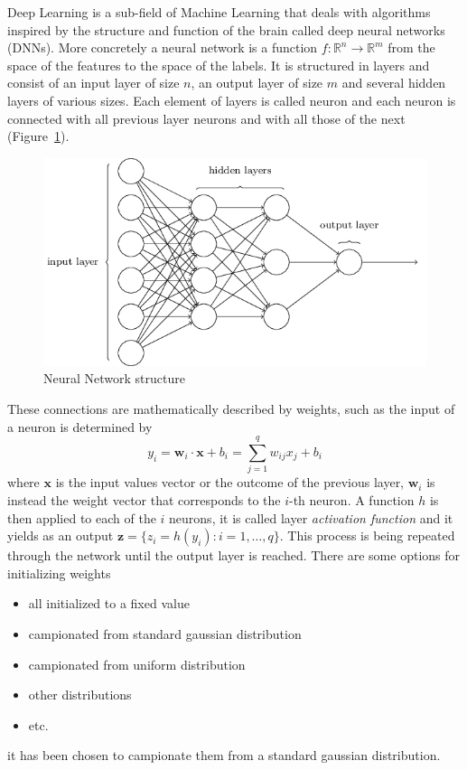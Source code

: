 Deep Learning is a sub-field of Machine Learning that deals with algorithms
inspired by the structure and function of the brain called deep neural
networks (DNNs).
More concretely a neural network is a function
$f\colon\mathbb{R}^n\to\mathbb{R}^m$ from the space of the features to the
space of the labels. It is structured in layers and consist of an input
layer of size $n$, an output layer of size $m$ and several hidden layers
of various sizes. Each element of layers is called neuron and each neuron
is connected with all previous layer neurons and with all those of the
next (Figure~\ref{nns}).
\begin{figure}[htpb]
 \centering
 \includegraphics[scale=0.55]{figures/nnstructure.png}
 \caption{Neural Network structure}
 \label{nns}
\end{figure}
These connections are mathematically described by weights, such as the input
of a neuron is determined by
\[
 y_i = \mathbf{w}_i \cdot \mathbf{x} + b_i = \sum_{j=1}^{q}w_{ij}x_j + b_i
\]
where $\mathbf{x}$ is the input values vector or the outcome of the
previous layer, $\mathbf{w}_i$ is instead the weight vector that corresponds
to the $i$-th neuron. A function $h$ is then applied to each of the $i$
neurons, it is called layer \textit{activation function} and it
yields as an output $\mathbf{z}=\{ z_i = h(y_i)\colon i = 1,\ldots,q\}$. This
process is being repeated through the network until the output layer is
reached.
There are some options for initializing weights
\begin{itemize}
 \item all initialized to a fixed value
 \item campionated from standard gaussian distribution
 \item campionated from uniform distribution
 \item other distributions
 \item etc.
\end{itemize}
it has been chosen to campionate them from a standard gaussian distribution.

